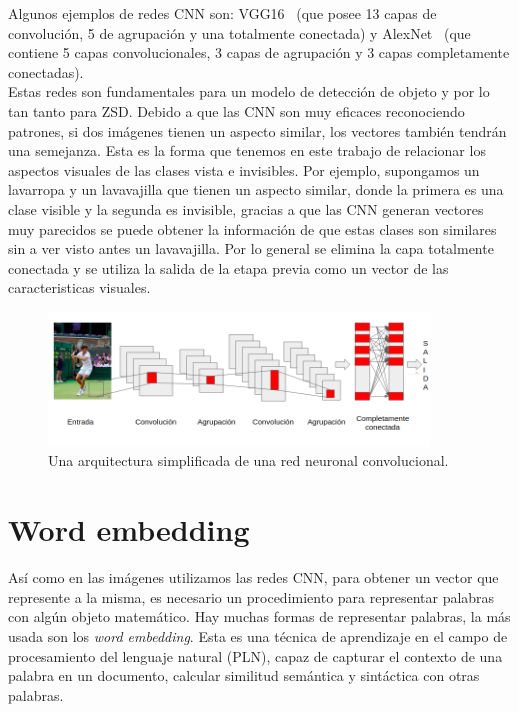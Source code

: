 Algunos ejemplos de redes CNN son: VGG16~\cite{simonyan2014very} (que posee 13 capas de convolución, 5 de agrupación y una totalmente conectada) y AlexNet~\cite{krizhevsky2012imagenet} (que contiene 5 capas convolucionales, 3 capas de agrupación y 3 capas completamente conectadas).\\

Estas redes son fundamentales para un modelo de detección de objeto y por lo tan tanto para ZSD. Debido a que las CNN son muy eficaces reconociendo patrones, si dos imágenes tienen un aspecto similar, los vectores también tendrán una semejanza. Esta es la forma que tenemos en este trabajo de relacionar los aspectos visuales de las clases vista e invisibles. Por ejemplo, supongamos un lavarropa y un lavavajilla que tienen un aspecto similar, donde la primera es una clase visible y la segunda es invisible, gracias a que las CNN generan vectores muy parecidos se puede obtener la información de que estas clases son similares sin a ver visto antes un lavavajilla. Por lo general se elimina la capa totalmente conectada y se utiliza la salida de la etapa previa como un vector de las caracteristicas visuales.

\begin{figure}
	\centering
	\includegraphics[width=0.9\textwidth]{img/red_cnn.png}
	\caption{Una arquitectura simplificada de una red neuronal convolucional.}
	\label{fig:CNNEjemplo}
\end{figure}

\section{Word embedding} \label{sec:wordembedding}
Así como en las imágenes utilizamos las redes CNN, para obtener un vector que represente a la misma, es necesario un procedimiento para representar palabras con algún objeto matemático. Hay muchas formas de representar palabras, la más usada son los \textit{word embedding}. Esta es una técnica de aprendizaje en el campo de procesamiento del lenguaje natural (PLN), capaz de capturar el contexto de una palabra en un documento, calcular similitud semántica y sintáctica con otras palabras.\\

